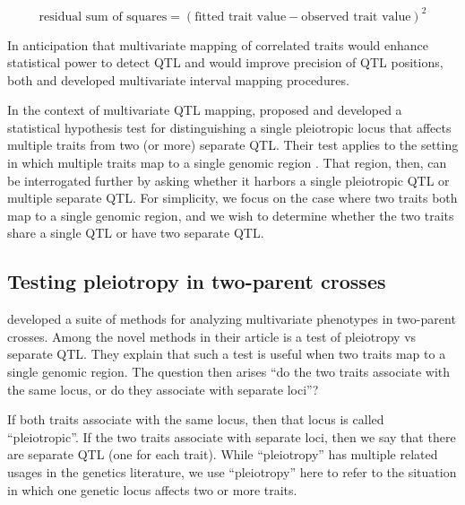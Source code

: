 \documentclass[]{article}\usepackage[]{graphicx}\usepackage[]{color}
\begin{document}
\begin{equation}
\text{residual sum of squares} = \left(\text{fitted trait value} - \text{observed trait value}\right)^2\label{eq:rss}
\end{equation}




In anticipation that multivariate mapping of correlated traits would enhance statistical
power to detect QTL and would improve precision of QTL positions,
both \citet{jiang1995multiple} and \citet{korol1995interval} developed
multivariate interval mapping procedures. 





In the context of multivariate QTL mapping, \citet{jiang1995multiple} 
proposed and developed a statistical hypothesis test for distinguishing
a single pleiotropic locus that affects multiple traits from two (or more)
separate QTL.
Their test applies to the setting in which multiple traits
map to a single genomic region \citep{jiang1995multiple}. 
That region, then, can be interrogated further by asking whether it
harbors a single pleiotropic QTL or multiple separate QTL. 
For simplicity, we focus on the case where two traits both map to a single genomic region,
and we wish to determine whether the two traits share a single QTL or have two separate QTL. 

\subsection{Testing pleiotropy in two-parent crosses}

\citet{jiang1995multiple} developed a suite of methods for analyzing multivariate phenotypes in
two-parent crosses.
Among the novel methods in their article is a test of pleiotropy vs separate QTL.
They explain that such a test is useful when two traits map to a single genomic region.
The question then arises ``do the two traits associate with the same locus, or do they associate with separate loci''?

If both traits associate with the same locus, then that locus is called ``pleiotropic''. If the two traits associate with separate loci, then we say that there are separate QTL (one for each trait). While ``pleiotropy'' has multiple related usages in the genetics literature, we use ``pleiotropy'' here to refer to the situation in which one genetic locus affects two or more traits. 
\end{document}
